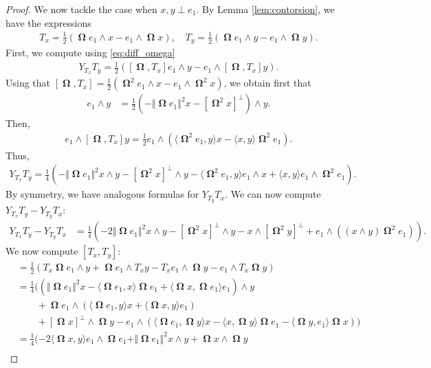 \documentclass[12pt]{amsart}
\numberwithin{numbering}{section}
\theoremstyle{plain}
\theoremstyle{definition}
\theoremstyle{remark}
\numberwithin{equation}{section}
\DeclareMathOperator{\oo}{\mathbf{\Omega}}
\begin{document}
\begin{proof}
We now tackle the case when $x, y \perp e_1$. By Lemma \ref{lem:contorsion}, we have the expressions 
\begin{align*}
T_x = \frac{1}{2}(\oo e_1 \wedge x - e_1 \wedge \oo x), \quad T_y = \frac{1}{2}(\oo e_1 \wedge y - e_1 \wedge \oo y).
\end{align*}
First, we compute using \eqref{eq:diff_omega}
\begin{align*}
Y_{T_x} T_y = \frac{1}{2} ([\oo, T_x] e_1 \wedge y - e_1 \wedge [\oo, T_x] y).
\end{align*}
Using that $[\oo, T_x] = \frac{1}{2} (\oo^2 e_1 \wedge x - e_1 \wedge \oo^2 x)$, we obtain first that 
\begin{align*}
[\oo, T_x] e_1  \wedge y
&= \frac{1}{2} (-\Vert \oo e_1 \Vert^2 x - [\oo^2 x]^\perp) \wedge y.
\end{align*}
Then, 
\begin{align*}
e_1 \wedge [\oo, T_x] y 
= \frac{1}{2} e_1 \wedge ( \langle \oo^2 e_1, y \rangle x - \langle x, y \rangle \oo^2 e_1).
\end{align*}
Thus, 
\begin{align*}
Y_{T_x} T_y = \frac{1}{4} (- \Vert \oo e_1 \Vert^2 x \wedge y - [\oo^2 x]^\perp \wedge y - \langle \oo^2 e_1, y \rangle e_1 \wedge x + \langle x, y \rangle e_1 \wedge \oo^2 e_1).
\end{align*}
By symmetry, we have analogous formulas for $Y_{T_y} T_x$. We can now compute $Y_{T_x} T_y - Y_{T_y} T_x$:
\begin{align} \label{eq:bracket10}
Y_{T_x} T_y - Y_{T_y} T_x
&= \frac{1}{4} (- 2 \Vert \oo e_1 \Vert^2 x \wedge y - [\oo^2 x]^\perp \wedge y - x \wedge [\oo^2 y]^\perp + e_1 \wedge ((x \wedge y) \oo^2 e_1)).
\end{align}
We now compute $[T_x, T_y]$:
\begin{align*}
[T_x, T_y] &= \frac{1}{2} (T_x \oo e_1 \wedge y + \oo e_1 \wedge T_x y - T_x e_1 \wedge \oo y - e_1 \wedge T_x \oo y) \\ 
&= \frac{1}{4} ((\Vert \oo e_1 \Vert^2 x - \langle \oo e_1, x \rangle \oo e_1 + \langle \oo x, \oo e_1 \rangle e_1) \wedge y \\ 
&\quad \quad + \oo e_1 \wedge (\langle \oo e_1, y \rangle x + \langle \oo x, y \rangle e_1) \\ 
&\quad \quad + [\oo x]^\perp \wedge \oo y - e_1 \wedge ( \langle \oo e_1, \oo y \rangle x - \langle x, \oo y \rangle \oo e_1 - \langle \oo y, e_1 \rangle \oo x)) \\ 
&= \frac{1}{4} (-2 \langle \oo x, y \rangle e_1 \wedge \oo e_1 + \Vert \oo e_1 \Vert^2 x \wedge y + \oo x \wedge \oo y \\ 

\end{align*}
\end{proof}
\end{document}
